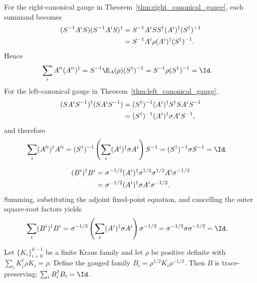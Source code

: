 For the right-canonical gauge in
Theorem~\ref{thm:right_canonical_gauge}, each summand becomes
\begin{align}
    (S^{-1}A^iS)(S^{-1}A^iS)^\dagger
     & =S^{-1}A^iSS^\dagger(A^i)^\dagger(S^\dagger)^{-1}
    \notag                                               \\
     & =S^{-1}A^i\rho(A^i)^\dagger(S^\dagger)^{-1}.
    \notag
\end{align}
Hence
\begin{align}
    \sum_iA'^i(A'^i)^\dagger
     & =S^{-1}\E_A(\rho)(S^\dagger)^{-1}
    =S^{-1}\rho(S^\dagger)^{-1}
    =\Id.
    \notag
\end{align}
For the left-canonical gauge in Theorem~\ref{thm:left_canonical_gauge},
\begin{align}
    (SA^iS^{-1})^\dagger(SA^iS^{-1})
     & =(S^\dagger)^{-1}(A^i)^\dagger S^\dagger SA^iS^{-1}
    \notag                                                 \\
     & =(S^\dagger)^{-1}(A^i)^\dagger\sigma A^iS^{-1},
    \notag
\end{align}
and therefore
\begin{align}
    \sum_i(A'^i)^\dagger A'^i
     & =(S^\dagger)^{-1}
    \left(\sum_i(A^i)^\dagger\sigma A^i\right)S^{-1}
    =(S^\dagger)^{-1}\sigma S^{-1}
    =\Id.
    \notag
\end{align}

\begin{align}
    (B^i)^\dagger B^i
     & =\sigma^{-1/2}(A^i)^\dagger
    \sigma^{1/2}\sigma^{1/2}A^i\sigma^{-1/2}
    \notag                                                 \\
     & =\sigma^{-1/2}(A^i)^\dagger\sigma A^i\sigma^{-1/2}.
    \notag
\end{align}
Summing, substituting the adjoint fixed-point equation, and cancelling the
outer square-root factors yields
\begin{align}
    \sum_i(B^i)^\dagger B^i
     & =\sigma^{-1/2}
    \left(\sum_i(A^i)^\dagger\sigma A^i\right)\sigma^{-1/2}
    =\sigma^{-1/2}\sigma\sigma^{-1/2}
    =\Id.
    \notag
\end{align}

\begin{theorem}%
    \label{thm:kraus_tp_gauge_from_adjoint_fixed}
    \leanok
    Let $\{K_i\}_{i=0}^{d-1}$ be a finite Kraus family and let $\rho$ be
    positive definite with $\sum_i K_i^\dagger \rho K_i = \rho$. Define the
    gauged family $B_i = \rho^{1/2} K_i \rho^{-1/2}$. Then $B$ is
    trace-preserving: $\sum_i B_i^\dagger B_i = \Id$.
\end{theorem}

